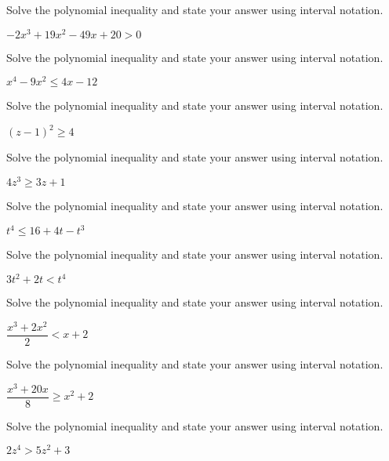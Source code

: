 \documentclass{ximera}
\begin{document}
\begin{problem}\label{polyinequexerfirst}
Solve the polynomial inequality and state your answer using interval notation.

$-2x^{3} + 19x^{2} - 49x + 20 > 0$   
\end{problem}
 
\begin{problem}
Solve the polynomial inequality and state your answer using interval notation.

$x^{4} - 9x^{2} \leq 4x - 12$
\end{problem}

\begin{problem}
Solve the polynomial inequality and state your answer using interval notation.

$(z - 1)^{2} \geq 4$
\end{problem}

\begin{problem}
Solve the polynomial inequality and state your answer using interval notation.

$4z^3 \geq 3z+1$
\end{problem}

\begin{problem}
Solve the polynomial inequality and state your answer using interval notation.

$t^4 \leq 16+4t-t^3$
\end{problem}

\begin{problem}
Solve the polynomial inequality and state your answer using interval notation.

$3t^2 + 2t < t^4$
\end{problem}

\begin{problem}
Solve the polynomial inequality and state your answer using interval notation.

$\dfrac{x^3+2 x^2}{2} < x+2$
\end{problem}

\begin{problem}
Solve the polynomial inequality and state your answer using interval notation.

$\dfrac{x^3+20x}{8} \geq x^2 + 2$
\end{problem}

\begin{problem}
Solve the polynomial inequality and state your answer using interval notation.

$2z^4>5z^2+3$
\end{problem}
\end{document}
